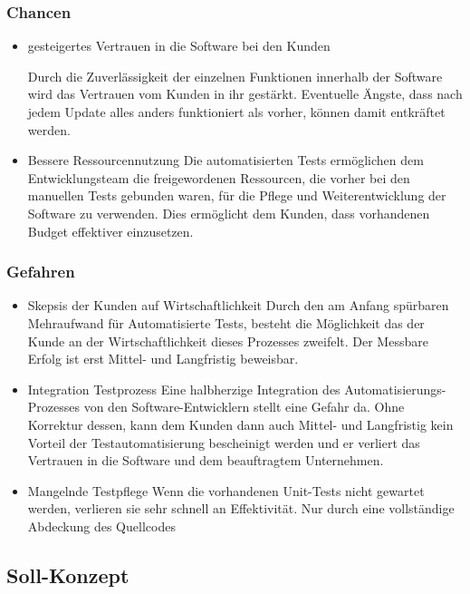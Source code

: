 \subsubsection{Chancen}
\begin{itemize}	
	\item gesteigertes Vertrauen in die Software bei den Kunden
	
	Durch die Zuverlässigkeit der einzelnen Funktionen innerhalb der Software wird das Vertrauen vom Kunden in ihr gestärkt. Eventuelle Ängste, dass nach jedem Update alles anders funktioniert als vorher, können damit entkräftet werden.
	
	\item Bessere Ressourcennutzung
	Die automatisierten Tests ermöglichen dem Entwicklungsteam die freigewordenen Ressourcen, die vorher bei den manuellen Tests gebunden waren, für die Pflege und Weiterentwicklung der Software zu verwenden. Dies ermöglicht dem Kunden, dass vorhandenen Budget effektiver einzusetzen.
	
\end{itemize}
	\subsubsection{Gefahren}
\begin{itemize}	
	\item Skepsis der Kunden auf Wirtschaftlichkeit
	Durch den am Anfang spürbaren Mehraufwand für Automatisierte Tests, besteht die Möglichkeit das der Kunde an der Wirtschaftlichkeit dieses Prozesses zweifelt. Der Messbare Erfolg ist erst Mittel- und Langfristig beweisbar.
	
	\item Integration Testprozess
	Eine halbherzige Integration des Automatisierungs-Prozesses von den Software-Entwicklern stellt eine Gefahr da. Ohne Korrektur dessen, kann dem Kunden dann auch Mittel- und Langfristig kein Vorteil der Testautomatisierung bescheinigt werden und er verliert das Vertrauen in die Software und dem beauftragtem Unternehmen.
	
	\item Mangelnde Testpflege
	Wenn die vorhandenen Unit-Tests nicht gewartet werden, verlieren sie sehr schnell an Effektivität. Nur durch eine vollständige Abdeckung des Quellcodes 
	
	
\end{itemize}

\subsection{Soll-Konzept}
